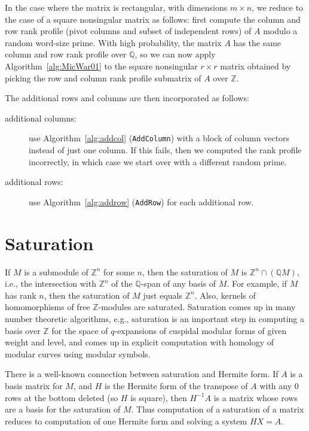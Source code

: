 \documentclass[preprint,12pt]{elsarticle}
\newcommand{\Z}{\mathbb{Z}}
\newcommand{\Q}{\mathbb{Q}}
\theoremstyle{plain}
\theoremstyle{definition}
\numberwithin{equation}{section}
\numberwithin{figure}{section}
\numberwithin{table}{section}
\begin{document}
In the case where the matrix is rectangular, with dimensions $m\times
n$, we reduce to the case of a square nonsingular matrix as follows:
first compute the column and row rank profile (pivot columns and
subset of independent rows) of $A$ modulo a random word-size
prime. With high probability, the matrix $A$ has the same column and
row rank profile over $\Q$, so we can now apply
Algorithm~\ref{alg:MicWar01} to the square nonsingular $r\times r$ matrix obtained
by picking the row and column rank profile submatrix of $A$ over
$\mathbb{Z}$.

The additional rows and columns are then incorporated as follows:
\begin{description}
\item[additional columns:] use Algorithm~\ref{alg:addcol}
  (\texttt{AddColumn}) with a block of column vectors instead of just
  one column.  If this fails, then we computed the rank profile
  incorrectly, in which case we start over with a different random
  prime.
  \item[additional rows:] use Algorithm~\ref{alg:addrow}
    (\texttt{AddRow}) for each additional row.
\end{description}



\section{Saturation}

If $M$ is a submodule of $\Z^n$ for some $n$, then the saturation of
$M$ is $\Z^n \cap (\Q M)$, i.e., the intersection with $\Z^n$ of the
$\Q$-span of any basis of $M$.  For example, if $M$ has rank $n$, then
the saturation of $M$ just equals $\Z^n$.  Also, kernels of
homomorphisms of free $\Z$-modules are saturated.  Saturation comes up
in many number theoretic algorithms, e.g., saturation is an important
step in computing a basis over $\Z$ for the space of $q$-expansions of
cuspidal modular forms of given weight and level, and comes up in
explicit computation with homology of modular curves using modular
symbols.

There is a well-known connection between saturation and Hermite
form. If $A$ is a basis matrix for $M$, and $H$ is the Hermite form of
the transpose of $A$ with any 0 rows at the bottom deleted (so $H$ is
square), then $H^{-1} A$ is a matrix whose rows are a basis for the
saturation of $M$.  Thus computation of a saturation of a matrix
reduces to computation of one Hermite form and solving a system $HX =
A$.
\end{document}
